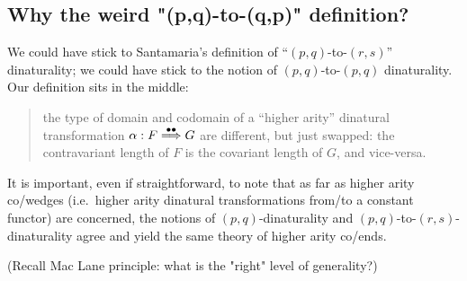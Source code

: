 \documentclass[11pt]{amsart}
\begin{document}
\subsection{Why the weird "(p,q)-to-(q,p)" definition?}
We could have stick to Santamaria's definition of ``$(p,q)$-to-$(r,s)$'' dinaturality; we could have stick to the notion of $(p,q)$-to-$(p,q)$ dinaturality. Our definition sits in the middle:
\begin{quote}
	the type of domain and codomain of a ``higher arity'' dinatural transformation $\alpha : F \overset{\bullet\bullet}\Longrightarrow G$ are different, but just swapped: the contravariant length of $F$ is the covariant length of $G$, and vice-versa.
\end{quote}
It is important, even if straightforward, to note that as far as higher arity co/wedges (i.e.\ higher arity dinatural transformations from/to a constant functor) are concerned, the notions of $(p,q)$-dinaturality and $(p,q)$-to-$(r,s)$-dinaturality agree and yield the same theory of higher arity co/ends.

(Recall Mac Lane principle: what is the "right" level of generality?)
\end{document}
